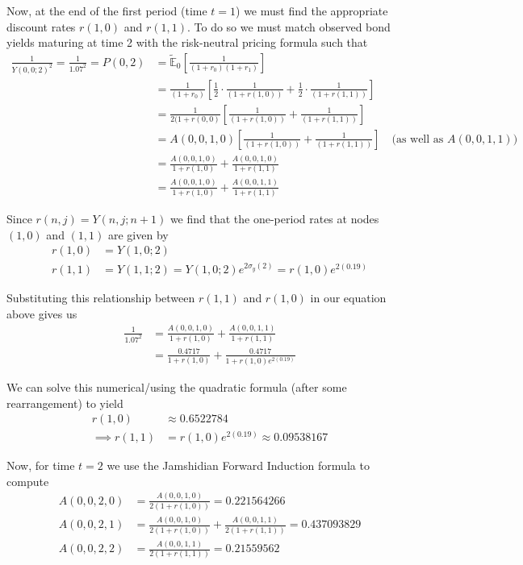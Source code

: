 \documentclass[12pt]{article}
\newlength\tindent
\renewcommand{\indent}{\hspace*{\tindent}}
\newcommand{\E}{\mathbb E}
\begin{document}
\indent Now, at the end of the first period (time $t = 1$) we must find the appropriate discount rates $r(1,0)$ and $r(1,1)$. To do so we must match observed bond yields maturing at time 2 with the risk-neutral pricing formula such that
\begin{align*}
	\frac{1}{Y(0,0;2)^2} = \frac{1}{1.07^2} = P(0,2) &= \tilde{\E}_0 \left[ \frac{1}{(1 + r_0)(1 + r_1)} \right] \\
	&= \frac{1}{(1 + r_0)} \left[ \frac{1}{2} \cdot \frac{1}{(1 + r(1,0))} + \frac{1}{2} \cdot \frac{1}{(1 + r(1,1))} \right] \\
	&= \frac{1}{2(1 + r(0,0)} \left[ \frac{1}{(1 + r(1,0))} + \frac{1}{(1 + r(1,1))} \right] \\
	&= A(0,0,1,0) \left[ \frac{1}{(1 + r(1,0))} + \frac{1}{(1 + r(1,1))} \right] \quad \text{(as well as $A(0,0,1,1)$)} \\
	&= \frac{A(0,0,1,0)}{1 + r(1,0)} + \frac{A(0,0,1,0)}{1 + r(1,1)} \\
	&= \frac{A(0,0,1,0)}{1 + r(1,0)} + \frac{A(0,0,1,1)}{1 + r(1,1)}
\end{align*}

\indent Since $r(n,j) = Y(n,j;n + 1)$ we find that the one-period rates at nodes $(1,0)$ and $(1,1)$ are given by
\begin{align*}
	r(1,0) &= Y(1,0;2) \\
	r(1,1) &= Y(1,1;2) = Y(1,0;2)e^{2\sigma_y(2)} = r(1,0)e^{2(0.19)}
\end{align*}

Substituting this relationship between $r(1,1)$ and $r(1,0)$ in our equation above gives us
\begin{align*}
	\frac{1}{1.07^2} &= \frac{A(0,0,1,0)}{1 + r(1,0)} + \frac{A(0,0,1,1)}{1 + r(1,1)} \\
	&= \frac{0.4717}{1 + r(1,0)} + \frac{0.4717}{1 + r(1,0)e^{2(0.19)}}
\end{align*}

We can solve this numerical/using the quadratic formula (after some rearrangement) to yield
\begin{align*}
	r(1,0) &\approx 0.6522784 \\
	\implies r(1,1) &= r(1,0)e^{2(0.19)} \approx 0.09538167
\end{align*}

Now, for time $t = 2$ we use the Jamshidian Forward Induction formula to compute
\begin{align*}
	A(0,0,2,0) &= \frac{ A(0,0,1,0) }{2 ( 1 + r(1,0) )} = 0.221564266 \\
	A(0,0,2,1) &= \frac{A(0,0,1,0)}{2(1 + r(1,0))} + \frac{A(0,0,1,1)}{2(1 + r(1,1))} = 0.437093829 \\
	A(0,0,2,2) &= \frac{A(0,0,1,1)}{2(1 + r(1,1))} = 0.21559562
\end{align*}
\end{document}

